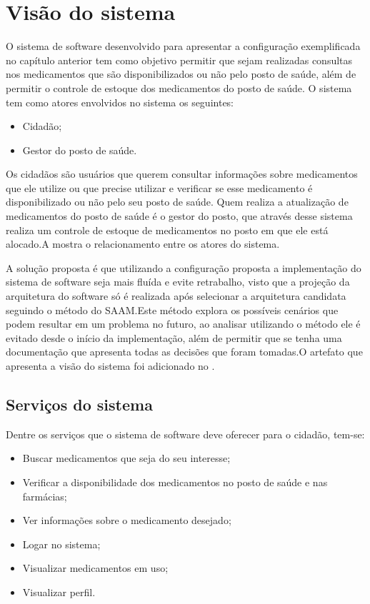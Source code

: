 \section{Visão do sistema}
O sistema de software desenvolvido para apresentar a configuração exemplificada no capítulo anterior tem como
objetivo permitir que sejam realizadas consultas nos medicamentos que são disponibilizados ou não pelo posto de saúde, além de permitir o controle de estoque dos medicamentos do posto de saúde.
O sistema tem como atores envolvidos no sistema os seguintes:
\begin{itemize}
    \item Cidadão;
    \item Gestor do posto de saúde.
\end{itemize}

Os cidadãos são usuários que querem consultar informações sobre medicamentos que ele utilize ou que precise utilizar e verificar se esse medicamento é disponibilizado ou não pelo seu posto de saúde. Quem realiza a atualização de medicamentos do posto de saúde é o gestor do posto, que através desse sistema realiza um controle de estoque de medicamentos no posto em que ele está alocado.A  mostra o relacionamento entre os atores do sistema.

%

A solução proposta é que utilizando a configuração proposta a implementação do sistema de software seja mais fluída e evite retrabalho, visto que a projeção da arquitetura do software só é realizada após selecionar a arquitetura candidata seguindo o método do \acrfull{SAAM}.Este método explora os possíveis cenários que podem resultar em um problema no futuro, ao analisar utilizando o método ele é evitado desde o início da implementação, além de permitir que se tenha uma documentação que apresenta todas as decisões que foram tomadas.O artefato que apresenta a visão do sistema foi adicionado no .

\subsection{Serviços do sistema}
 Dentre os serviços que o sistema de software deve oferecer para o cidadão, tem-se:
 
 \begin{itemize}
     \item Buscar medicamentos que seja do seu interesse;
     \item Verificar a disponibilidade dos medicamentos no posto de saúde  e nas farmácias;
     \item Ver informações sobre o medicamento desejado;
     \item Logar no sistema;
     \item Visualizar medicamentos em uso;
     \item Visualizar perfil.
    \end{itemize}
 
